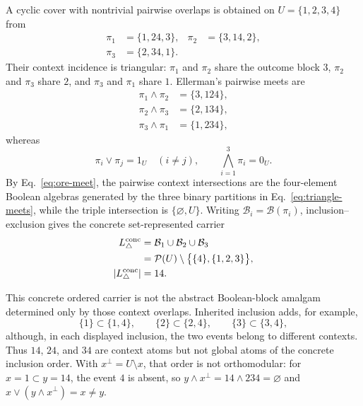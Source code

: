\documentclass[aps,pra,reprint,nofootinbib]{revtex4-2}
\newcommand{\Pow}{\mathcal{P}}
\newcommand{\BA}{\mathcal{B}}
\begin{document}
A cyclic cover with nontrivial pairwise overlaps is obtained on
$U=\{1,2,3,4\}$ from
\begin{equation}
  \begin{aligned}
  \pi_1&=\{1,24,3\},&
  \pi_2&=\{3,14,2\},\\
  \pi_3&=\{2,34,1\}.
  \end{aligned}
  \label{eq:triangle-partitions}
\end{equation}
Their context incidence is triangular: $\pi_1$ and $\pi_2$ share the outcome
block $3$, $\pi_2$ and $\pi_3$ share $2$, and $\pi_3$ and $\pi_1$ share $1$.
Ellerman's pairwise meets are
\begin{equation}
  \begin{aligned}
  \pi_1\wedge\pi_2&=\{3,124\},\\
  \pi_2\wedge\pi_3&=\{2,134\},\\
  \pi_3\wedge\pi_1&=\{1,234\},
  \end{aligned}
  \label{eq:triangle-meets}
\end{equation}
whereas
\begin{equation}
  \pi_i\vee\pi_j=1_U\quad(i\ne j),
  \qquad
  \bigwedge_{i=1}^{3}\pi_i=0_U.
  \label{eq:triangle-extremes}
\end{equation}
By Eq.~\eqref{eq:ore-meet}, the pairwise context intersections are the
four-element Boolean algebras generated by the three binary partitions in
Eq.~\eqref{eq:triangle-meets}, while the triple intersection is
$\{\varnothing,U\}$.  Writing $\BA_i=\BA(\pi_i)$, inclusion--exclusion gives
the concrete set-represented carrier
\begin{equation}
  \begin{aligned}
  L_{\triangle}^{\rm conc}
  &=\BA_1\cup\BA_2\cup\BA_3\\
  &=\Pow(U)\setminus\bigl\{\{4\},\{1,2,3\}\bigr\},\\
  |L_{\triangle}^{\rm conc}|&=14.
  \end{aligned}
  \label{eq:triangle-carrier}
\end{equation}

This concrete ordered carrier is not the abstract Boolean-block amalgam
determined only by those context overlaps.  Inherited inclusion adds, for
example,
\begin{equation}
  \{1\}\subset\{1,4\},\qquad
  \{2\}\subset\{2,4\},\qquad
  \{3\}\subset\{3,4\},
  \label{eq:triangle-extra-order}
\end{equation}
although, in each displayed inclusion, the two events belong to different
contexts.  Thus $14$, $24$,
and $34$ are context atoms but not global atoms of the concrete inclusion
order.  With $x^\perp=U\setminus x$, that order is not orthomodular: for
$x=1\subset y=14$, the event $4$ is absent, so
$y\wedge x^\perp=14\wedge234=\varnothing$ and
$x\vee(y\wedge x^\perp)=x\ne y$.
\end{document}
